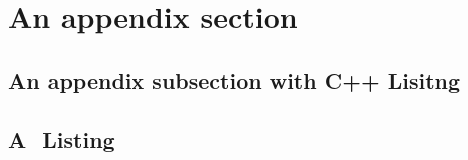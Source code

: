 \documentclass[a4paper,11pt]{mscThesis}
\begin{document}
    \section{An appendix section}

    \subsection{An appendix subsection with C++ Lisitng}

    \lstset{language=C++}
    

    \subsection{A \matlab $ $ Listing}

    \lstset{language=matlab}
    
    
\begin{comment}
	


    \chapter{Yet another appendix}

    \section{Another test section}

    Ok, all is well.

    \printindex%
    \cleardoublepage%
    
\end{comment}
   
\end{document}
